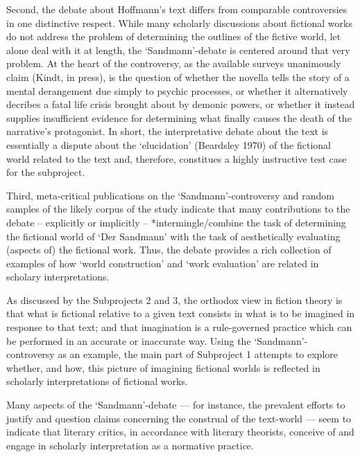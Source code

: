 Second, the debate about Hoffmann's text differs from comparable controversies in one distinctive respect. While many scholarly discussions about fictional works do not address the problem of determining the outlines of the fictive world, let alone deal with it at length, the `Sandmann'-debate is centered around that very problem. At the heart of the controversy, as the available surveys unanimously claim (Kindt, in press), is the question of whether the novella tells the story of a mental derangement due simply to psychic processes, or whether it alternatively decribes a fatal life crisis brought about by demonic powers, or whether it instead supplies insufficient evidence for determining what finally causes the death of the narrative's protagonist. In short, the interpretative debate about the text is essentially a dispute about the `elucidation' (Beardsley 1970) of the fictional world related to the text and, therefore, constitues a highly instructive test case for the subproject. 

Third, meta-critical publications on the `Sandmann'-controversy and random samples of the likely corpus of the study indicate that many contributions to the debate -- explicitly or implicitly -- *intermingle/combine the task of determining the fictional world of `Der Sandmann' with the task of aesthetically evaluating (aspects of) the fictional work. Thus, the debate provides a rich collection of examples of how `world construction' and `work evaluation' are related in scholary interpretations.

As discussed by the Subprojects 2 and 3, the orthodox view in fiction theory is that what is fictional relative to a given text consists in what is to be imagined in response to that text; and that imagination is a rule-governed practice which can be performed in an accurate or inaccurate way. Using the `Sandmann'-controversy as an example, the main part of Subproject 1 attempts to explore whether, and how, this picture of imagining fictional worlds is reflected in scholarly interpretations of fictional works.

Many aspects of the `Sandmann'-debate --- for instance, the prevalent efforts to justify and question claims concerning the construal of the text-world --- seem to indicate that literary critics, in accordance with literary theorists, conceive of and engage in scholarly interpretation as a normative practice.  

